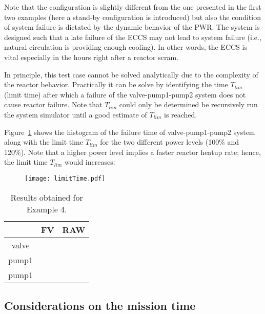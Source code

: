 Note that the configuration is slightly different from the one presented in the first two 
examples (here a stand-by configuration is introduced) but also the condition of system failure 
is dictated by the dynamic behavior of the PWR. The system is designed such that a late failure 
of the ECCS may not lead to system failure (i.e., natural circulation is providing enough cooling). 
In other words, the ECCS is vital especially in the hours right after a reactor scram.

In principle, this test case cannot be solved analytically due to the complexity of the reactor 
behavior. Practically it can be solve by identifying the time $T_{lim}$ (limit time) after which a 
failure of the valve-pump1-pump2 system does not cause reactor failure.
Note that $T_{lim}$ could only be determined be recursively run the system simulator until a 
good estimate of $T_{lim}$ is reached.

Figure~\ref{fig:limitTime} shows the histogram of the failure time of valve-pump1-pump2 system along 
with the limit time $T_{lim}$ for the two different power levels (100\% and 120\%). 
Note that a higher power level implies a faster reactor heatup rate; hence, the limit time $T_{lim}$
would increases: 

\begin{figure}
    \centering
    \centerline{\texttt{[image: limitTime.pdf]}}
    \caption{}
    \label{fig:limitTime}
\end{figure}

\begin{table}
  \caption{Results obtained for Example 4.}
  \centering
  \begin{tabular}{c | c | c }
    \hline
          & FV & RAW \\
    \hline
    valve &  &   \\
    pump1 &  &   \\
    pump1 &  &   \\
    \hline
  \end{tabular}
  \label{tab:example4}
\end{table}

\subsection{Considerations on the mission time}
\label{sec:missionTime}
